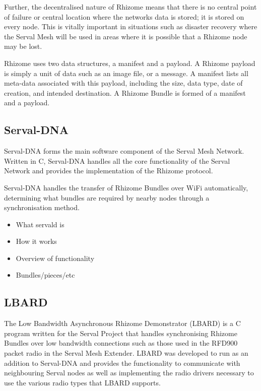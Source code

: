 Further, the decentralised nature of Rhizome means that there is no central point of failure or central location where the networks data is stored; it is stored on every node.
This is vitally important in situations such as disaster recovery where the Serval Mesh will be used in areas where it is possible that a Rhizome node may be lost.

Rhizome uses two data structures, a manifest and a payload.
A Rhizome payload is simply a unit of data such as an image file, or a message.
A manifest lists all meta-data associated with this payload, including the size, data type, date of creation, and intended destination.
A Rhizome Bundle is formed of a manifest and a payload. 


\subsection{Serval-DNA}
Serval-DNA forms the main software component of the Serval Mesh Network.
Written in C, Serval-DNA handles all the core functionality of the Serval Network and provides the implementation of the Rhizome protocol.

Serval-DNA handles the transfer of Rhizome Bundles over WiFi automatically, determining what bundles are required by nearby nodes through a synchronisation method.


\begin{itemize}
    \item What servald is
    \item How it works
    \item Overview of functionality
    \item Bundles/pieces/etc
\end{itemize}


\subsection{LBARD}
The Low Bandwidth Asynchronous Rhizome Demonstrator (LBARD) is a C program written for the Serval Project that handles synchronising Rhizome Bundles over low bandwidth connections such as those used in the RFD900 packet radio in the Serval Mesh Extender.
LBARD was developed to run as an addition to Serval-DNA and provides the functionality to communicate with neighbouring Serval nodes as well as implementing the radio drivers necessary to use the various radio types that LBARD supports.

